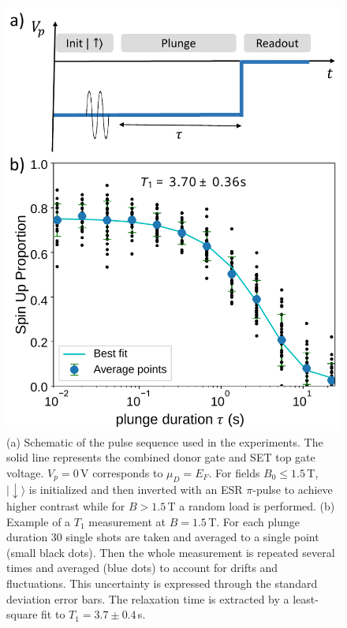 \documentclass[%
 reprint,
 amsmath,amssymb,
 aps,
]{revtex4-1}
\newcommand {\ket} [1] {|{ #1 \rangle}}
\begin{document}
\begin{figure}
\centering
\includegraphics[width=0.7\columnwidth]{figures/fig2.pdf}
\caption{
(a) Schematic of the pulse sequence used in the experiments. The solid line represents the combined donor gate and SET top gate voltage. $V_p=0\,$V corresponds to $\mu_D=E_F$. For fields $B_0\leq1.5\,$T, $\ket{\downarrow}$ is initialized and then inverted with an ESR $\pi$-pulse to achieve higher contrast while for $B>1.5\,$T a random load is performed. (b) Example of a $T_1$ measurement at $B=1.5\,$T. For each plunge duration $30$ single shots are taken and averaged to a single point (small black dots). Then the whole measurement is repeated several times and averaged (blue dots) to account for drifts and fluctuations. This uncertainty is expressed through the standard deviation error bars. The relaxation time is extracted by a least-square fit to $T_1=3.7\pm0.4\,$s.
}
\label{fig:t1example}
\end{figure}
\end{document}
